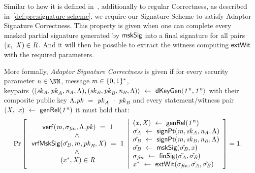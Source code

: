 Similar to how it is defined in~\cite{aumayr2020bitcoinchannels}, additionally to regular Correctness, as described  in~\cref{def:pre:signature-scheme}, we require our Signature Scheme to satisfy Adaptor Signature Correctness.
This property is given when one can complete every masked partial signature generated by $\mathsf{mskSig}$ into a final signature for all pairs $(\mathit{x} ,~ \mathit{X}) \in \mathit{R}$.
And it will then be possible to extract the witness computing $\mathsf{extWit}$ with the required parameters.

\begin{definition}
    \label{def:sig:apt-sig-correctness}
    More formally, \emph{Adaptor Signature Correctness} is given if for every security parameter $\varN \in \cnstNatural$, message $\mathit{m} \in \{0,1\}^{*}$, \\ keypairs $\langle (\mathit{sk}_{\mathit{A}}, \mathit{pk}_{\mathit{A}}, \mathit{\mathit{n}_{\mathit{A}}}, \Lambda), (\mathit{sk}_{\mathit{B}}, \mathit{pk}_{\mathit{B}}, \mathit{\mathit{n}_{\mathit{B}}}, \Lambda) \rangle ~\leftarrow~ \mathsf{dKeyGen}\langle \mathit{1^n}, \mathit{1^n} \rangle$ with their composite public key $\Lambda.\mathit{pk} ~=~ \mathit{pk}_{\mathit{A}} ~\cdot~ \mathit{pk}_{\mathit{B}}$ and every statement/witness pair $(\mathit{X} ,~ \mathit{x}) ~\leftarrow~ \mathsf{genRel}(\mathit{1^n})$ it must hold that:
    \[
        \Pr\left[
        \begin{array}{c}
            \:\mathsf{verf}(\mathit{m}, \sigma_{\mathit{fin}}, \Lambda.\mathit{pk}) ~=~ 1                                         \\
            ~\land~                                                                                              \\
            \: \mathsf{vrfMskSig}(\hat{\sigma_{\mathit{B}}},\mathit{m},\mathit{pk}_{\mathit{B}},\mathit{X}) ~=~ 1             \\
            ~\land~                                                                                              \\
            \:(\mathit{x}^*, \mathit{X}) \in \mathit{R}
        \end{array}
        \middle\vert
        \begin{array}{l}
            (\mathit{x}, \mathit{X}) ~\leftarrow~ \mathsf{genRel}(\mathit{1^n}) \\
            \tilde{\sigma_{\mathit{A}}} ~\leftarrow~ \mathsf{signPt}(\mathit{m}, \mathit{sk}_{\mathit{A}}, \mathit{\mathit{n}_{\mathit{A}}}, \Lambda)        \\
            \tilde{\sigma_{\mathit{B}}} ~\leftarrow~ \mathsf{signPt}(\mathit{m}, \mathit{sk}_{\mathit{B}}, \mathit{\mathit{n}_{\mathit{B}}}, \Lambda)              \\
            \hat{\sigma_{\mathit{B}}} ~\leftarrow~ \mathsf{mskSig}(\tilde{\sigma_{\mathit{B}}}, \mathit{x})                                             \\
            \sigma_{\mathit{fin}} ~\leftarrow~ \mathsf{finSig}(\tilde{\sigma_{\mathit{A}}}, \tilde{\sigma_{\mathit{B}}})                                           \\
            \mathit{x}^* ~\leftarrow~ \mathsf{extWit}(\sigma_{\mathit{fin}}, \tilde{\sigma_{\mathit{A}}}, \hat{\sigma_{\mathit{B}}})
        \end{array}
        \right]=1.
    \]
\end{definition}